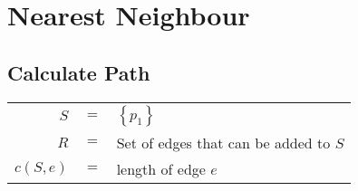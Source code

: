 \documentclass[
	final,
	a4paper,
	oneside,
	parskip=full,
	headings=standardclasses,
	headings=big,
	pointednumbers
]{scrartcl}
\newcommand{\kl}[1]{{\left( #1 \right)}}
\newcommand{\kq}[1]{{\left\{ #1 \right\}}}
\begin{document}

    \begin{minipage}[t]{.5\linewidth}
        \section*{Nearest Neighbour}

        \subsection*{Calculate Path}
    \end{minipage}
    \begin{minipage}[t]{.5\linewidth}
            \begin{tabular}[t]{@{} r @{\hskip 1mm} c @{\hskip 1mm} l @{}}
                         $S$ & $=$ & $\kq{p_1}$ \\
                         $R$ & $=$ & Set of edges that can be added to $S$ \\
                $c\kl{S, e}$ & $=$ & length of edge $e$
            \end{tabular}
    \end{minipage}
\end{document}
